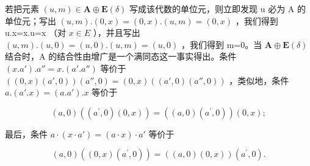 若把元素 \((u,m)\in\mathbf{A}\oplus\mathbf{E}(\delta)\) 写成该代数的单位元，则立即发现 u 必为 A 的单位元；写出 \((u,m).(0,x)=(0,x).(u,m)=(0,x)\) ，我们得到 u.x=x.u=x （对 \(x\in E\) ），并且写出 \((u,m).(u,0)=(u,0).(u,m)=(u,0)\) ，我们得到 m=0。当 \(\mathbf{A}\oplus\mathbf{E}(\delta)\) 结合时，A 的结合性由增广是一个满同态这一事实得出。条件 \((x.a') .a''=x.(a'.a'')\) 等价于 \(((0,x)(a',0))(a'',0)=(0,x)((a',0)(a'',0))\) ，类似地，条件 \(a.(a'.x)=(a.a').x\) 等价于

\[
(a, 0) ((a ^ {\prime}, 0) (0, x)) = ((a, 0) (a ^ {\prime}, 0)) (0, x);
\]

最后，条件 \(a \cdot (x \cdot a') = (a \cdot x) \cdot a'\) 等价于

\[
(a, 0) ((0, x) (a ^ {\prime}, 0)) = ((a, 0) (0, x)) (a ^ {\prime}, 0).
\]

